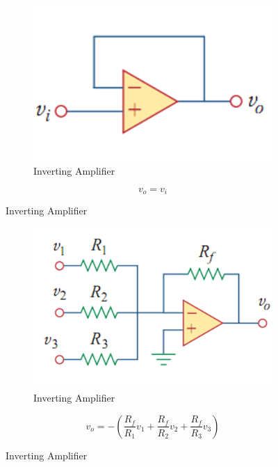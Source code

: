 \documentclass[a4paper,11pt,UTF8]{article}
\begin{document}
\begin{figure}[H]
	\begin{minipage}{.5\textwidth}
		\begin{figure}[H] 
			\centering 
			\includegraphics[scale=0.5]{./img/9.3.png}
			\caption{Inverting Amplifier}
		\end{figure}
	\end{minipage}
	\begin{minipage}{.5\textwidth}
		\LARGE{$$
			v_o=v_i
			$$}
	\end{minipage}
\end{figure}

\begin{figure}[H]
	\begin{minipage}{.5\textwidth}
		\begin{figure}[H] 
			\centering 
			\includegraphics[scale=0.5]{./img/9.4.png}
			\caption{Inverting Amplifier}
		\end{figure}
	\end{minipage}
	\begin{minipage}{.5\textwidth}
		\LARGE{$$
			v_o=-(\frac{R_f}{R_1}v_1+\frac{R_f}{R_2}v_2+\frac{R_f}{R_3}v_3)
			$$}
	\end{minipage}
\end{figure}
\end{document}
